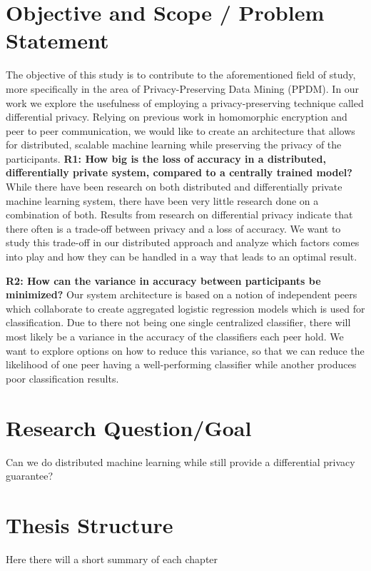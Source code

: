 \section{Objective and Scope / Problem Statement}
The objective of this study is to contribute to the aforementioned field of study, more specifically in the area of Privacy-Preserving Data Mining (PPDM). In our work we explore the usefulness  of employing a privacy-preserving technique called differential privacy. Relying on previous work in homomorphic encryption and peer to peer communication, we would like to create an architecture that allows for distributed, scalable machine learning while preserving the privacy of the participants.
\textbf{R1: How big is the loss of accuracy in a distributed, differentially private system, compared to a centrally trained model?}
While there have been research on both distributed and differentially private machine learning system, there have been very little research done on a combination of both. Results from research on differential privacy indicate that there often is a trade-off between privacy and a loss of accuracy. We want to study this trade-off in our distributed approach and analyze which factors comes into play and how they can be handled in a way that leads to an optimal result. 

\textbf{R2: How can the variance in accuracy between participants be minimized?}
Our system architecture is based on a notion of independent peers which collaborate to create aggregated logistic regression models which is used for classification. Due to there not being one single centralized classifier, there will most likely be a variance in the accuracy of the classifiers each peer hold. We want to explore options on how to reduce this variance, so that we can reduce the likelihood of one peer having a well-performing classifier while another produces poor classification results. 



\section{Research Question/Goal}
Can we do distributed machine learning while still provide a differential privacy guarantee?


\section{Thesis Structure}
Here there will a short summary of each chapter


